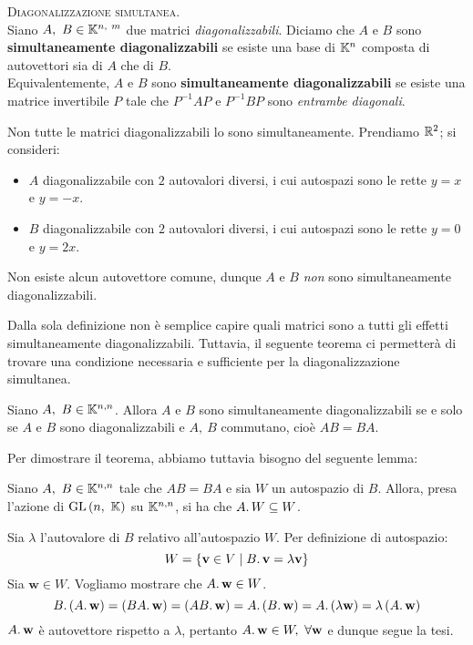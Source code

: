 \begin{define}\textsc{Diagonalizzazione simultanea}.\\
	Siano $A,\ B\in\mathbb{K}^{n,\ m}$ due matrici \textit{diagonalizzabili}. Diciamo che $A$ e $B$ sono \textbf{simultaneamente diagonalizzabili} se esiste una base di $\mathbb{K}^n$ composta di autovettori sia di $A$ che di $B$.\\
	Equivalentemente, $A$ e $B$ sono \textbf{simultaneamente diagonalizzabili} se esiste una matrice invertibile $P$ tale che $P^{-1}AP$ e $P^{-1}BP$ sono \textit{entrambe diagonali}.
\end{define}
\begin{example}
	Non tutte le matrici diagonalizzabili lo sono simultaneamente. Prendiamo $\mathbb{R}^2$; si consideri:
	\begin{itemize}
		\item $A$ diagonalizzabile con $2$ autovalori diversi, i cui autospazi sono le rette $y=x$ e $y=-x$.
		\item $B$ diagonalizzabile con $2$ autovalori diversi, i cui autospazi sono le rette $y=0$ e $y=2x$.
	\end{itemize}
Non esiste alcun autovettore comune, dunque $A$ e $B$ \textit{non} sono simultaneamente diagonalizzabili.
\end{example}
Dalla sola definizione non è semplice capire quali matrici sono a tutti gli effetti simultaneamente diagonalizzabili. Tuttavia, il seguente teorema ci permetterà di trovare una condizione necessaria e sufficiente per la diagonalizzazione simultanea.
\begin{theorema}\label{teoremasimdiag}
	Siano $A,\ B\in\mathbb{K}^{n, n}$. Allora $A$ e $B$ sono simultaneamente diagonalizzabili se e solo se $A$ e $ B$ sono diagonalizzabili e $A,\ B$ commutano, cioè $AB=BA$.
\end{theorema}
Per dimostrare il teorema, abbiamo tuttavia bisogno del seguente lemma:
\begin{lemming}
	Siano $A,\ B\in\mathbb{K}^{n, n}$ tale che $AB=BA$ e sia $W$ un autospazio di $B$. Allora, presa l'azione di $\gl\left(n,\ \kamp\right)$ su $\mathbb{K}^{n, n}$, si ha che $A\ldotp W\subseteq W$.
\end{lemming}
\begin{demonstration}
	Sia $\lambda$ l'autovalore di $B$ relativo all'autospazio $W$. Per definizione di autospazio:
	\begin{equation*}
		W=\left\{\mathbf{v}\in V\mid B\ldotp \mathbf{v}=\lambda \mathbf{v}\right\}
	\end{equation*}
Sia $\mathbf{w}\in W$. Vogliamo mostrare che $A\ldotp \mathbf{w}\in W$.
\begin{equation*}
	B\ldotp\left(A\ldotp\mathbf{w}\right)=\left(BA\ldotp\mathbf{w}\right)=\left(AB\ldotp\mathbf{w}\right)=A\ldotp\left(B\ldotp\mathbf{w}\right)=A\ldotp\left(\lambda\mathbf{w}\right)=\lambda\left(A\ldotp\mathbf{w}\right)
\end{equation*}
$A\ldotp \mathbf{w}$ è autovettore rispetto a $\lambda$, pertanto $A\ldotp \mathbf{w}\in W,\ \forall \mathbf{w}$ e dunque segue la tesi.
\end{demonstration}
